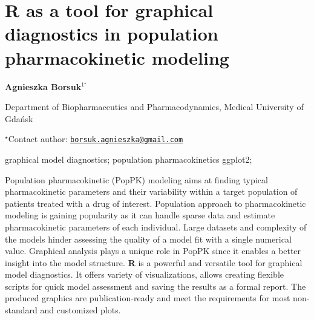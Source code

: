 \documentclass[\main/boa.tex]{subfiles}
\begin{document}
\section{R as a tool for graphical diagnostics in population pharmacokinetic
modeling}

\begin{center}
  {\bf {} Agnieszka Borsuk$^{1^\star}$}
\end{center}

\vskip 0.3cm

\begin{affiliations}
\begin{enumerate}
\begin{minipage}{0.915\textwidth}
\centering
\item Department of Biopharmaceutics and Pharmacodynamics, Medical University
of Gdańsk \\[-2pt]
\end{minipage}
\end{enumerate}
$^\star$Contact author: \href{mailto:borsuk.agnieszka@gmail.com}{\nolinkurl{borsuk.agnieszka@gmail.com}}\\
\end{affiliations}

\vskip 0.5cm

\begin{minipage}{0.915\textwidth}
\keywords graphical model diagnostics; population pharmacokinetics
\packages {} ggplot2; 
\end{minipage}

\vskip 0.8cm

Population pharmacokinetic (PopPK) modeling aims at finding typical
pharmacokinetic parameters and their variability within a target
population of patients treated with a drug of interest. Population
approach to pharmacokinetic modeling is gaining popularity as it can
handle sparse data and estimate pharmacokinetic parameters of each
individual. Large datasets and complexity of the models hinder assessing
the quality of a model fit with a single numerical value. Graphical
analysis plays a unique role in PopPK since it enables a better insight
into the model structure. \textbf{R} is a powerful and versatile tool
for graphical model diagnostics. It offers variety of visualizations,
allows creating flexible scripts for quick model assessment and saving
the results as a formal report. The produced graphics are
publication-ready and meet the requirements for most non-standard and
customized plots.
\end{document}
